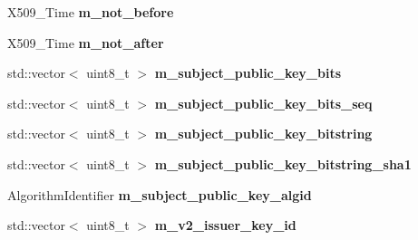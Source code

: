 \begin{DoxyCompactItemize}
\mbox{\label{struct_botan_1_1_x509___certificate___data_a4d158e0f0322c0f7334a27ca0592db43}} 
X509\+\_\+\+Time {\bfseries m\+\_\+not\+\_\+before}
\item 
\mbox{\label{struct_botan_1_1_x509___certificate___data_a6c104658a529186f46eeb73acc939b1b}} 
X509\+\_\+\+Time {\bfseries m\+\_\+not\+\_\+after}
\item 
\mbox{\label{struct_botan_1_1_x509___certificate___data_aa576497c512beb887f0b16b7a7157d8b}} 
std\+::vector$<$ uint8\+\_\+t $>$ {\bfseries m\+\_\+subject\+\_\+public\+\_\+key\+\_\+bits}
\item 
\mbox{\label{struct_botan_1_1_x509___certificate___data_aa31813f72d87bd8d99b9ef74f5836554}} 
std\+::vector$<$ uint8\+\_\+t $>$ {\bfseries m\+\_\+subject\+\_\+public\+\_\+key\+\_\+bits\+\_\+seq}
\item 
\mbox{\label{struct_botan_1_1_x509___certificate___data_afc4b8f91e0b39b3398a5e36c6b412fdb}} 
std\+::vector$<$ uint8\+\_\+t $>$ {\bfseries m\+\_\+subject\+\_\+public\+\_\+key\+\_\+bitstring}
\item 
\mbox{\label{struct_botan_1_1_x509___certificate___data_ab18cbe0bf9f48e576904f0873710c515}} 
std\+::vector$<$ uint8\+\_\+t $>$ {\bfseries m\+\_\+subject\+\_\+public\+\_\+key\+\_\+bitstring\+\_\+sha1}
\item 
\mbox{\label{struct_botan_1_1_x509___certificate___data_a43d84b476ec4bcf0fddbbefb72c30dbc}} 
Algorithm\+Identifier {\bfseries m\+\_\+subject\+\_\+public\+\_\+key\+\_\+algid}
\item 
\mbox{\label{struct_botan_1_1_x509___certificate___data_a2f1b2eeb999304e6963825850511b95c}} 
std\+::vector$<$ uint8\+\_\+t $>$ {\bfseries m\+\_\+v2\+\_\+issuer\+\_\+key\+\_\+id}
\item 
\mbox{\label{struct_botan_1_1_x509___certificate___data_a639500a978590e8ae6cccb4232de5604}} 

\end{DoxyCompactItemize}
